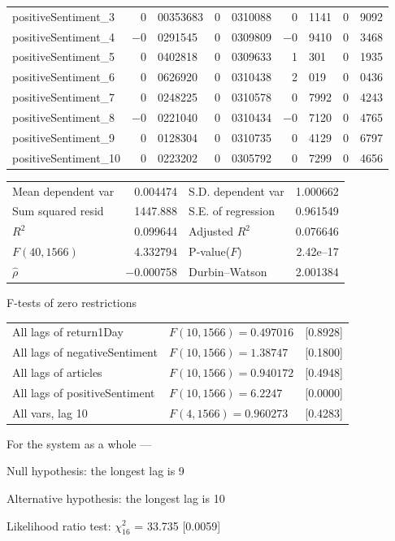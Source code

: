 \begin{center}
\begin{longtable}{lr@{.}lr@{.}lr@{.}lr@{.}l}
positiveSentiment\_3 &
    0&00353683 &
    0&0310088 &
        0&1141 &
        0&9092 \\
positiveSentiment\_4 &
    $-$0&0291545 &
    0&0309809 &
        $-$0&9410 &
        0&3468 \\
positiveSentiment\_5 &
    0&0402818 &
    0&0309633 &
        1&301 &
        0&1935 \\
positiveSentiment\_6 &
    0&0626920 &
    0&0310438 &
        2&019 &
        0&0436 \\
positiveSentiment\_7 &
    0&0248225 &
    0&0310578 &
        0&7992 &
        0&4243 \\
positiveSentiment\_8 &
    $-$0&0221040 &
    0&0310434 &
        $-$0&7120 &
        0&4765 \\
positiveSentiment\_9 &
    0&0128304 &
    0&0310735 &
        0&4129 &
        0&6797 \\
positiveSentiment\_10 &
    0&0223202 &
    0&0305792 &
        0&7299 &
        0&4656 \\
\end{longtable}

\begin{tabular}{lrlr}
Mean dependent var &  0.004474 & S.D. dependent var &  1.000662 \\
Sum squared resid &  1447.888 & S.E. of regression &  0.961549 \\
$R^2$ &  0.099644 & Adjusted $R^2$ &  0.076646 \\
$F(40, 1566)$ &  4.332794 & P-value($F$) &  2.42\textrm{e--17} \\
$\hat{\rho}$ & $-$0.000758 & Durbin--Watson &  2.001384 \\
\end{tabular}

\end{center}

\begin{center}
F-tests of zero restrictions\\[1em]
\begin{tabular}{lll}
All lags of return1Day & $F(10, 1566) = 0.497016$ & [0.8928]\\
All lags of negativeSentiment & $F(10, 1566) = 1.38747$ & [0.1800]\\
All lags of articles & $F(10, 1566) = 0.940172$ & [0.4948]\\
All lags of positiveSentiment & $F(10, 1566) = 6.2247$ & [0.0000]\\
All vars, lag 10 & $F(4, 1566) = 0.960273$ & [0.4283]\\
\end{tabular}
\end{center}

\noindent For the system as a whole ---\par
Null hypothesis: the longest lag is 9\par
Alternative hypothesis: the longest lag is 10\par
Likelihood ratio test: $\chi^2_{16}$ = 33.735 [0.0059]\par    